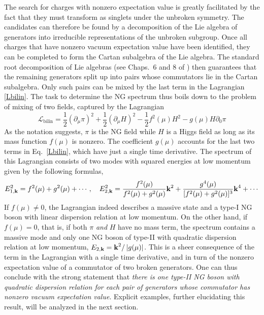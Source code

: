 \documentclass[final,2p,times,12pt,sort&compress]{elsarticle}
\newcommand\Lag{\mathscr{L}}                %
\newcommand\vek[1]{{\boldsymbol{\bf #1}}}   %
\newcommand\de{\partial}
\newcommand\abs[1]{\left|#1\right|}         %
\begin{document}
The search for charges with nonzero expectation value is greatly facilitated by
the fact that they must transform as singlets under the unbroken symmetry. The
candidates can therefore be found by a decomposition of the Lie algebra of
generators into irreducible representations of the unbroken subgroup.
Once all charges that have nonzero vacuum expectation value have been
identified, they can be completed to form the Cartan subalgebra of the Lie
algebra. The standard root decomposition of Lie algebras
(see Chaps.~6 and 8 of \cite{Georgi:1982jb}) then guarantees that the remaining
generators split up into pairs whose commutators lie in the Cartan subalgebra.
Only such pairs can be mixed by the last term in the Lagrangian \eqref{Lbilin}.
The task to determine the NG spectrum thus boils down to the problem of mixing
of two fields, captured by the Lagrangian
\begin{equation}
\Lag_{\text{bilin}}=\frac12(\de_\mu\pi)^2+\frac12(\de_\mu
H)^2-\frac12f^2(\mu)H^2-g(\mu)H\de_0\pi
\end{equation}
As the notation suggests, $\pi$ is the NG field while $H$ is a Higgs field as
long as its mass function $f(\mu)$ is nonzero. The coefficient $g(\mu)$ accounts
for the last two terms in Eq.~\eqref{Lbilin}, which have just a single time
derivative. The spectrum of this Lagrangian consists of two modes with squared
energies at low momentum given by the following formulas,
\begin{equation}
E_{1,\vek k}^2=f^2(\mu)+g^2(\mu)+\dotsb,\quad
E_{2,\vek k}^2=\frac{f^2(\mu)}{f^2(\mu)+g^2(\mu)}\vek k^2+
\frac{g^4(\mu)}{[f^2(\mu)+g^2(\mu)]^3}\vek k^4+\dotsb
\end{equation}
If $f(\mu)\neq0$, the Lagrangian indeed describes a massive state and a type-I
NG boson with linear dispersion relation at low momentum. On the other hand, if
$f(\mu)=0$, that is, if both $\pi$ \emph{and} $H$ have no mass term, the
spectrum contains a massive mode and only one NG boson of type-II with
quadratic dispersion relation at low momentum, $E_{2,\vek k}=\vek
k^2/\abs{g(\mu)}$. This is a sheer consequence of the term in the Lagrangian
with a single time derivative, and in turn of the nonzero expectation value of
a commutator of two broken generators. One can thus conclude with the strong
statement that \emph{there is one type-II NG boson with quadratic dispersion
relation for each pair of generators whose commutator has nonzero vacuum
expectation value}. Explicit examples, further elucidating this result,
will be analyzed in the next section.
\end{document}
